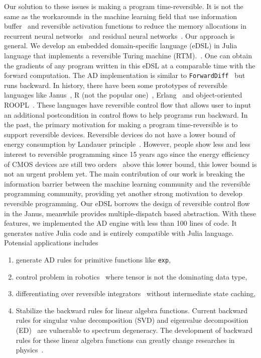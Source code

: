 \documentclass[aps,twocolumn,longbibliography,english,superscriptaddress]{revtex4-1}
\newcommand{\<}{\langle}
\renewcommand{\>}{\rangle}
\theoremstyle{definition}\newtheorem{definition}{\textit{Definition}}
\begin{document}

Our solution to these issues is making a program time-reversible. It is not the same as the workarounds in the machine learning field that use information buffer~\cite{Maclaurin2015} and reversible activation functions to reduce the memory allocations in recurrent neural networks~\cite{MacKay2018} and residual neural networks~\cite{Behrmann2018}. Our approach is general. We develop an embedded domain-specific language (eDSL) in Julia language that implements a reversible Turing machine (RTM).~\cite{Perumalla2013,Frank2017}.
One can obtain the gradients of any program written in this eDSL at a comparable time with the forward computation. The AD implementation is similar to \texttt{ForwardDiff}~\cite{Revels2016} but runs backward.
    In history, there have been some prototypes of reversible languages like Janus~\cite{Lutz1986}, R (not the popular one)~\cite{Frank1997}, Erlang~\cite{Lanese2018} and object-oriented ROOPL~\cite{Haulund2017}. These languages have reversible control flow that allows user to input an additional postcondition in control flows to help programs run backward.
    In the past, the primary motivation for making a program time-reversible is to support reversible devices. Reversible devices do not have a lower bound of energy consumption by Landauer principle~\cite{Landauer1961}. However, people show less and less interest to reversible programming since 15 years ago since the energy efficiency of CMOS devices are still two orders~\cite{Frank2017} above this lower bound, this lower bound is not an urgent problem yet.
    The main contribution of our work is breaking the information barrier between the machine learning community and the reversible programming community, providing yet another strong motivation to develop reversible programming.
    Our eDSL borrows the design of reversible control flow in the Janus, meanwhile provides multiple-dispatch based abstraction. With these features, we implemented the AD engine with less than 100 lines of code. It generates native Julia code and is entirely compatible with Julia language.
Potensial applications includes
\begin{enumerate}
    \item generate AD rules for primitive functions like \texttt{exp},
    \item control problem in robotics~\cite{Giftthaler2017} where tensor is not the dominating data type,
    \item differentiating over reversible integrators~\cite{Laikov2018} without intermediate state caching,
    \item Stabilize the backward rules for linear algebra functions. Current backward rules for singular value decomposition (SVD) and eigenvalue decomposition (ED)~\cite{Seeger2017,Wan2019,Hubig2019} are vulnerable to spectrum degeneracy. The development of backward rules for these linear algebra functions can greatly change researches in physics~\cite{Xie2020,Liao2019}.

\end{enumerate}
\end{document}
